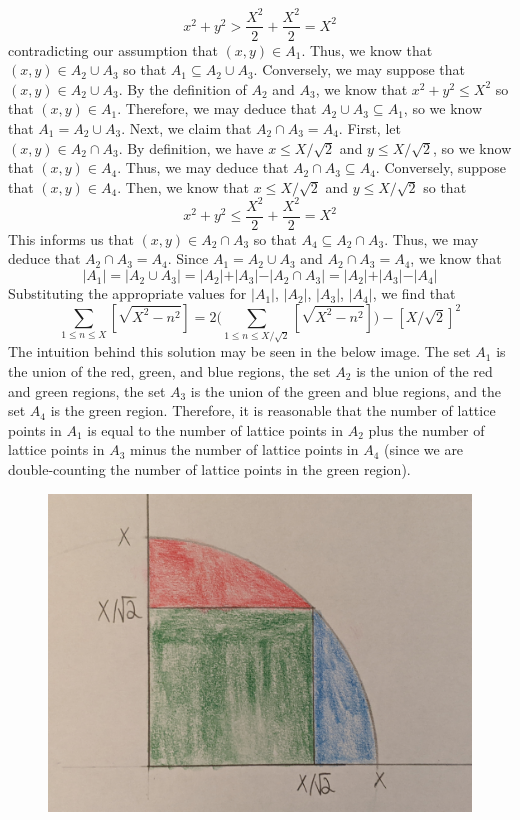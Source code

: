 \documentclass[12pt]{article}
\begin{document}
\[
x^2 + y^2 > \frac{X^2}{2} + \frac{X^2}{2} = X^2
\] contradicting our assumption that $(x,y) \in A_1$. Thus, we know that $(x,y) \in A_2 \cup A_3$ so that $A_1 \subseteq A_2 \cup A_3$. Conversely, we may suppose that $(x,y) \in A_2 \cup A_3$. By the definition of $A_2$ and $A_3$, we know that $x^2+y^2 \leq X^2$ so that $(x,y) \in A_1$. Therefore, we may deduce that $A_2 \cup A_3 \subseteq A_1$, so we know that $A_1 = A_2 \cup A_3$. Next, we claim that $A_2 \cap A_3 = A_4$. First, let $(x,y) \in A_2 \cap A_3$. By definition, we have $x \leq X/\sqrt{2}$ and $y \leq X/\sqrt{2}$, so we know that $(x,y) \in A_4$. Thus, we may deduce that $A_2 \cap A_3 \subseteq A_4$. Conversely, suppose that $(x,y) \in A_4$. Then, we know that $x \leq X/\sqrt{2}$ and $y \leq X/\sqrt{2}$ so that
\[
x^2 + y^2 \leq \frac{X^2}{2} + \frac{X^2}{2} = X^2
\] This informs us that $(x,y) \in A_2 \cap A_3$ so that $A_4 \subseteq A_2 \cap A_3$. Thus, we may deduce that $A_2 \cap A_3 = A_4$. Since $A_1 = A_2 \cup A_3$ and $A_2 \cap A_3 = A_4$, we know that
\[
\vert A_1 \vert = \vert A_2 \cup A_3 \vert = \vert A_2 \vert + \vert A_3 \vert - \vert A_2 \cap A_3 \vert = \vert A_2 \vert + \vert A_3 \vert - \vert A_4 \vert
\] Substituting the appropriate values for $\vert A_1 \vert$, $\vert A_2 \vert$, $\vert A_3 \vert$, $\vert A_4 \vert$, we find that
\[
\sum_{1\leq n \leq X} [\sqrt{X^2 -n^2}] = 2 \Bigg( \sum_{1 \leq n \leq X/\sqrt{2}} [\sqrt{X^2 - n^2}] \Bigg) - [X/\sqrt{2}]^2
\] The intuition behind this solution may be seen in the below image. The set $A_1$ is the union of the red, green, and blue regions, the set $A_2$ is the union of the red and green regions, the set $A_3$ is the union of the green and blue regions, and the set $A_4$ is the green region. Therefore, it is reasonable that the number of lattice points in $A_1$ is equal to the number of lattice points in $A_2$ plus the number of lattice points in $A_3$ minus the number of lattice points in $A_4$ (since we are double-counting the number of lattice points in the green region).
 \begin{figure}[H]
\centering
\includegraphics[width=\textwidth]{Problem3Image1}
\end{figure}
\newpage
\end{document}
